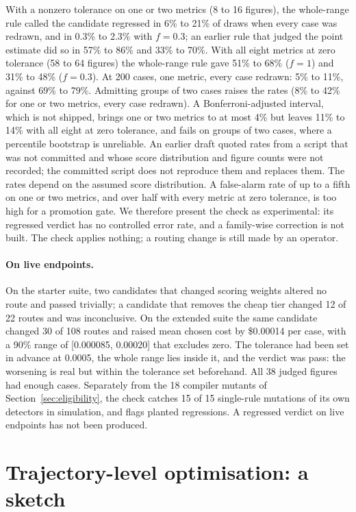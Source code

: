 \documentclass[11pt]{article}
\newcommand{\ubreak}{\textunderscore\allowbreak}
\newcommand{\code}[1]{{\ttfamily\let\_\ubreak #1}}
\begin{document}
With a nonzero tolerance on one or two metrics (8 to 16 figures), the whole-range rule called
the candidate regressed in 6\% to 21\% of draws when every case was redrawn, and in 0.3\% to 2.3\%
with $f = 0.3$; an earlier rule that judged the point estimate did so in 57\% to 86\% and 33\%
to 70\%. With all eight metrics at zero tolerance (58 to 64 figures) the whole-range rule gave
51\% to 68\% ($f = 1$) and 31\% to 48\% ($f = 0.3$). At 200 cases, one metric, every case
redrawn: 5\% to 11\%, against 69\% to 79\%. Admitting groups of two cases raises the rates
(8\% to 42\% for one or two metrics, every case redrawn). A Bonferroni-adjusted interval, which
is not shipped, brings one or two metrics to at most 4\% but leaves 11\% to 14\% with all eight
at zero tolerance, and fails on groups of two cases, where a percentile bootstrap is unreliable.
An earlier draft quoted rates from a script that was not committed and whose score distribution
and figure counts were not recorded; the committed script does not reproduce them and replaces
them. The rates depend on the assumed score distribution. A false-alarm rate of up to a fifth
on one or two metrics, and over half with every metric at zero tolerance, is too high for a
promotion gate. We therefore present the check as experimental: its \code{regressed} verdict
has no controlled error rate, and a family-wise correction is not built. The check applies nothing;
a routing change is still made by an operator.

\paragraph{On live endpoints.} On the starter suite, two candidates that
changed scoring weights altered no route and passed trivially; a candidate that removes the
cheap tier changed 12 of 22 routes and was \code{inconclusive}. On the extended suite the same
candidate changed 30 of 108 routes and raised mean chosen cost by \$0.00014 per case, with a 90\%
range of [0.000085, 0.00020] that excludes zero. The tolerance had been set in advance at
0.0005, the whole range lies inside it, and the verdict was \code{pass}: the worsening is real
but within the tolerance set beforehand. All 38 judged figures had enough
cases. Separately from the 18 compiler mutants of Section~\ref{sec:eligibility}, the check
catches 15 of 15 single-rule mutations of its own detectors in simulation, and flags planted
regressions. A \code{regressed} verdict on live endpoints has not been produced.


\section{Trajectory-level optimisation: a sketch}
\label{app:trajopt}
\end{document}
